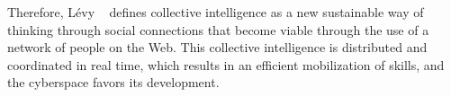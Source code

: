 Therefore, Lévy ~\cite{levy2001cyberculture} defines collective intelligence as a new sustainable way of thinking through social connections that become viable through the use of a network of people on the Web. This collective intelligence is distributed and coordinated in real time, which results in an efficient mobilization of skills, and the cyberspace favors its development. 







